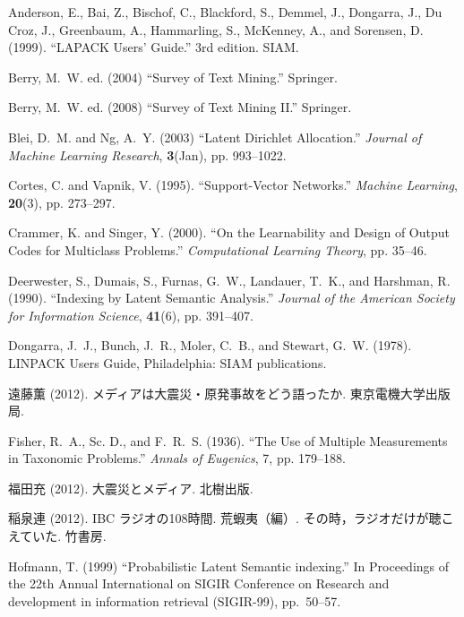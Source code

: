 \documentclass[japanese]{jnlp_1.4}
\begin{document}
\begin{thebibliography}{}
\item
Anderson, E., Bai, Z., Bischof, C., Blackford, S., Demmel, J., Dongarra, J., Du Croz, J., Greenbaum, A., Hammarling, S., McKenney, A., and Sorensen, D. (1999). ``LAPACK Users' Guide.'' 3rd edition. SIAM.

\item
Berry, M.~W. ed. (2004) ``Survey of Text Mining.'' Springer.

\item
Berry, M.~W. ed. (2008) ``Survey of Text Mining II.'' Springer.

\item
Blei, D.~M. and Ng, A.~Y. (2003) ``Latent Dirichlet Allocation.'' \textit{Journal of 
Machine Learning Research}, \textbf{3}(Jan), pp. 993--1022.

\item
Cortes, C. and Vapnik, V. (1995). ``Support-Vector Networks.'' 
\textit{Machine Learning}, \textbf{20}(3), pp. 273--297.

\item
Crammer, K. and Singer, Y. (2000). ``On the Learnability and Design of Output Codes 
for Multiclass
Problems.'' \textit{Computational Learning Theory}, pp. 35--46.

\item
Deerwester, S., Dumais, S., Furnas, G.~W., Landauer, T.~K., and Harshman, R. (1990). 
``Indexing by Latent Semantic Analysis.'' \textit{Journal of the American Society for 
Information Science}, \textbf{41}(6), pp. 391--407.

\item
Dongarra, J.~J., Bunch, J.~R., Moler, C.~B., and Stewart, G.~W. (1978). 
LINPACK Users Guide, Philadelphia: SIAM publications.

\item 
遠藤薫 (2012). メディアは大震災・原発事故をどう語ったか. 
東京電機大学出版局.

\item
Fisher, R.~A., Sc. D., and F.~R.~S. (1936). ``The Use of Multiple Measurements in Taxonomic 
Problems.'' \textit{Annals of Eugenics}, 7, pp. 179--188.

\item 
福田充 (2012). 大震災とメディア. 北樹出版.

\item 
稲泉連 (2012). IBC ラジオの108時間. 荒蝦夷（編）. その時，ラジオだけが聴こえていた. 竹書房.

\item
Hofmann, T. (1999) ``Probabilistic Latent Semantic indexing.'' In Proceedings 
of the 22th Annual International on SIGIR Conference on Research and development in information retrieval (SIGIR-99), pp.~50--57.


\end{thebibliography}
\end{document}
